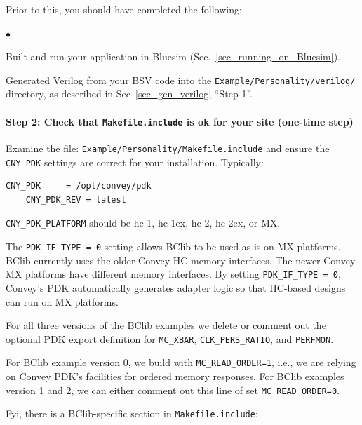 \documentclass[twoside,letterpaper,11pt]{article}
\newcommand{\hm}{\hspace*{1em}}
\newenvironment{tightlist}%
{\begin{list}{$\bullet$}{%
    \setlength{\topsep}{0in}
    \setlength{\partopsep}{0in}
    \setlength{\itemsep}{0in}
    \setlength{\parsep}{0in}
    \setlength{\leftmargin}{1.5em}
    \setlength{\rightmargin}{0in}
    \setlength{\itemindent}{0in}
}
}%
{\end{list}
}
\begin{document}
Prior to this, you should have completed the following:
\begin{tightlist}
\item Built and run your application in Bluesim (Sec.~\ref{sec_running_on_Bluesim}).

\item Generated Verilog from your BSV code into the
\verb|Example/Personality/verilog/| directory, as described in
Sec~\ref{sec_gen_verilog} ``Step 1''.

\end{tightlist}


\paragraph{Step 2: Check that {\tt Makefile.include} is ok for your site (one-time step)}
\hm

Examine the file: \verb|Example/Personality/Makefile.include| and
ensure the \verb|CNY_PDK| settings are correct for your installation.
Typically:

\begin{Verbatim}[frame=single]
    CNY_PDK     = /opt/convey/pdk
    CNY_PDK_REV = latest
\end{Verbatim}

\verb|CNY_PDK_PLATFORM| should be hc-1, hc-1ex, hc-2, hc-2ex, or MX.

The \verb|PDK_IF_TYPE = 0| setting allows BClib to be used as-is on MX
platforms.  BClib currently uses the older Convey HC memory
interfaces.  The newer Convey MX platforms have different memory
interfaces. By setting \verb|PDK_IF_TYPE = 0|, Convey's PDK
automatically generates adapter logic so that HC-based designs can run
on MX platforms.

For all three versions of the BClib examples we delete or comment out
the optional PDK export definition for \verb|MC_XBAR|,
\verb|CLK_PERS_RATIO|, and \verb|PERFMON|.

For BClib example version 0, we build with \verb|MC_READ_ORDER=1|,
i.e., we are relying on Convey PDK's facilities for ordered memory
responses.  For BClib examples version 1 and 2, we can either comment
out this line of set \verb|MC_READ_ORDER=0|.

Fyi, there is a BClib-specific section in \verb|Makefile.include|:
\end{document}
